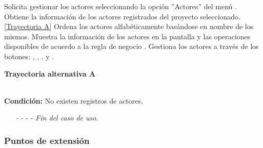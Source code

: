 \begin{UCtrayectoria}
	\UCpaso[\UCactor] Solicita gestionar los actores seleccionando la opción ''Actores'' del menú .
	\UCpaso[\UCsist] Obtiene la información de los actores registrados del proyecto seleccionado. \hyperlink{CU10:TAA}{[Trayectoria A]}
	\UCpaso[\UCsist] Ordena los actores alfabéticamente basándose en nombre de los mismos.
	\UCpaso[\UCsist] Muestra la información de los actores en la pantalla  y las operaciones disponibles de acuerdo a la regla de negocio . \label{CU10-P4}
	\UCpaso[\UCactor] Gestiona los actores a través de los botones: , \editar, \eliminar. y . 
\end{UCtrayectoria}		
\hypertarget{CU10:TAA}{\textbf{Trayectoria alternativa A}}\\
\noindent \textbf{Condición:} No existen registros de actores.
\begin{enumerate}
	\UCpaso[\UCsist] Muestra el mensaje  en la pantalla  para indicar que no hay registros de actores para mostrar. \label{CU10-TA1}
	\UCpaso[\UCactor] Gestiona los actores a través del botón: . 
	\item[- -] - - {\em {Fin del caso de uso}}.%
\end{enumerate}


\subsubsection{Puntos de extensión}

